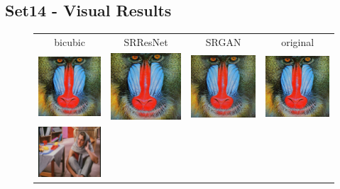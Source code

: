 \documentclass[10pt,twocolumn,letterpaper]{article}
\begin{document}
\subsection{Set14 - Visual Results}
\label{app:Set14}
\begin{figure}[h!]
\begin{tabular}{cccc}
bicubic & SRResNet & SRGAN & original \\
\includegraphics[width=1.5in]{images/used/appendix/jpg/Set14/baboon_bicubic}&
\includegraphics[width=1.5in]{images/used/appendix/jpg/Set14/baboon_SRResNet-MSE} &
\includegraphics[width=1.5in]{images/used/appendix/jpg/Set14/baboon_SRGAN-VGG54} &
\includegraphics[width=1.5in]{images/used/appendix/jpg/Set14/baboon_HR} \\
\includegraphics[width=1.5in]{images/used/appendix/jpg/Set14/barbara_bicubic}&

\end{tabular}
\end{figure}
\end{document}

